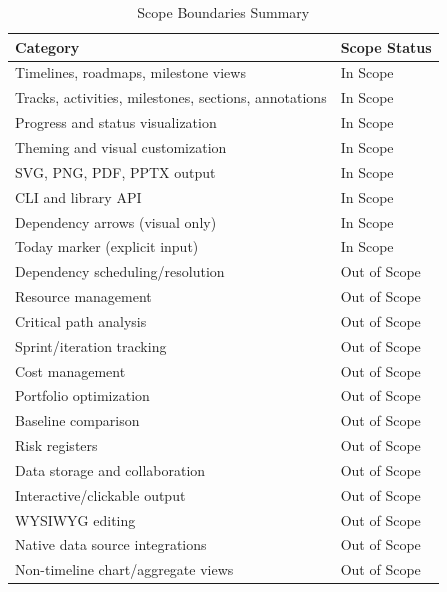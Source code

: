 \begin{table}[h]
\centering
\caption{Scope Boundaries Summary}
\begin{tabularx}{\textwidth}{lX}
\toprule
\textbf{Category} & \textbf{Scope Status} \\
\midrule
Timelines, roadmaps, milestone views & In Scope \\
Tracks, activities, milestones, sections, annotations & In Scope \\
Progress and status visualization & In Scope \\
Theming and visual customization & In Scope \\
SVG, PNG, PDF, PPTX output & In Scope \\
CLI and library API & In Scope \\
Dependency arrows (visual only) & In Scope \\
Today marker (explicit input) & In Scope \\
\midrule
Dependency scheduling/resolution & Out of Scope \\
Resource management & Out of Scope \\
Critical path analysis & Out of Scope \\
Sprint/iteration tracking & Out of Scope \\
Cost management & Out of Scope \\
Portfolio optimization & Out of Scope \\
Baseline comparison & Out of Scope \\
Risk registers & Out of Scope \\
Data storage and collaboration & Out of Scope \\
Interactive/clickable output & Out of Scope \\
WYSIWYG editing & Out of Scope \\
Native data source integrations & Out of Scope \\
Non-timeline chart/aggregate views & Out of Scope \\
\bottomrule
\end{tabularx}
\end{table}
